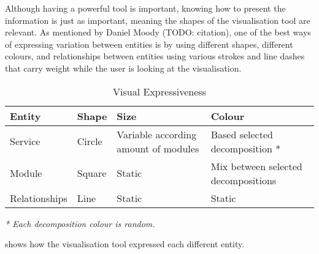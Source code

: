 Although having a powerful tool is important, knowing how to present the information is just as important, meaning the shapes of the visualisation tool are relevant. As mentioned by Daniel Moody (TODO: citation), one of the best ways of expressing variation between entities is by using different shapes, different colours, and relationships between entities using various strokes and line dashes that carry weight while the user is looking at the visualisation.

\begin{table}[!htb] \caption{Visual Expressiveness} \label{tab:visual_expressiveness}
  \begin{center}
    \begin{tabular}[c]{p{8em}|p{8em}|p{8em}|p{8em}}
      \textbf{Entity} &
      \textbf{Shape} &
      \textbf{Size} &
      \textbf{Colour} \\
      \hline Service & Circle & Variable according amount of modules & Based selected decomposition * \\
      \hline Module & Square & Static & Mix between selected decompositions \\
      \hline Relationships & Line & Static & Static \\
    \end{tabular}
  \end{center}
 \vspace{1ex}
 {\raggedright \textit{* Each decomposition colour is random.} \par}
\end{table}

 shows how the visualisation tool expressed each different entity.


